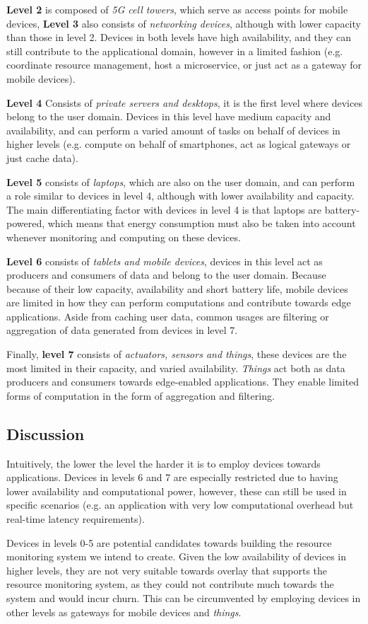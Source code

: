 \textbf{Level 2} is composed of \textit{5G cell towers}, which serve as access points for mobile devices, \textbf{Level 3} also consists of \textit{networking devices}, although with lower capacity than those in level 2. Devices in both levels have high availability, and they can still contribute to the applicational domain, however in a limited fashion (e.g. coordinate resource management, host a microservice, or just act as a gateway for mobile devices).

\textbf{Level 4} Consists of \textit{private servers and desktops}, it is the first level where devices belong to the user domain. Devices in this level have medium capacity and availability, and can perform a varied amount of tasks on behalf of devices in higher levels (e.g. compute on behalf of smartphones, act as logical gateways or just cache data). 

\textbf{Level 5} consists of \textit{laptops}, which are also on the user domain, and can perform a role similar to devices in level 4, although with lower availability and capacity. The main differentiating factor with devices in level 4 is that laptops are battery-powered, which means that energy consumption must also be taken into account whenever monitoring and computing on these devices. 

\textbf{Level 6} consists of \textit{tablets and mobile devices}, devices in this level act as producers and consumers of data and belong to the user domain. Because because of their low capacity, availability and short battery life, mobile devices are limited in how they can perform computations and contribute towards edge applications. Aside from caching user data, common usages are filtering or aggregation of data generated from devices in level 7. 

Finally, \textbf{level 7} consists of \textit{actuators, sensors and things}, these devices are the most limited in their capacity, and varied availability. \textit{Things} act both as data producers and consumers towards edge-enabled applications. They enable limited forms of computation in the form of aggregation and filtering.

\subsection{Discussion}

Intuitively, the lower the level the harder it is to employ devices towards applications. Devices in levels 6 and 7 are especially restricted due to having lower availability and computational power, however, these can still be used in specific scenarios (e.g. an application with very low computational overhead but real-time latency requirements). 

Devices in levels 0-5 are potential candidates towards building the resource monitoring system we intend to create. Given the low availability of devices in higher levels, they are not very suitable towards overlay that supports the resource monitoring system, as they could not contribute much towards the system and would incur churn. This can be circumvented by employing devices in  other levels as gateways for mobile devices and \textit{things}.